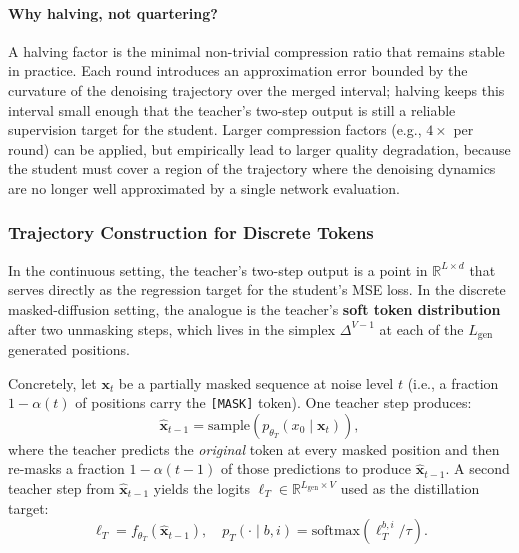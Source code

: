 \documentclass[11pt, a4paper]{article}
\begin{document}
\paragraph{Why halving, not quartering?}
A halving factor is the minimal non-trivial compression ratio that remains stable in
practice. Each round introduces an approximation error bounded by the curvature of the
denoising trajectory over the merged interval; halving keeps this interval small enough
that the teacher's two-step output is still a reliable supervision target for the student.
Larger compression factors (e.g., $4\times$ per round) can be applied, but empirically
lead to larger quality degradation, because the student must cover a region of the
trajectory where the denoising dynamics are no longer well approximated by a single
network evaluation.

\subsubsection{Trajectory Construction for Discrete Tokens}
\label{subsubsec:trajectory_construction}

In the continuous setting, the teacher's two-step output is a point in
$\mathbb{R}^{L \times d}$ that serves directly as the regression target for the student's
MSE loss. In the discrete masked-diffusion setting, the analogue is the teacher's
\textbf{soft token distribution} after two unmasking steps, which lives in the simplex
$\Delta^{V-1}$ at each of the $L_{\text{gen}}$ generated positions.

Concretely, let $\mathbf{x}_t$ be a partially masked sequence at noise level $t$ (i.e.,
a fraction $1-\alpha(t)$ of positions carry the \texttt{[MASK]} token). One teacher
step produces:
\begin{equation}
    \hat{\mathbf{x}}_{t-1} = \mathrm{sample}\!\left(
        p_{\theta_T}(x_0 \mid \mathbf{x}_t)
    \right),
    \label{eq:one_teacher_step}
\end{equation}
where the teacher predicts the \emph{original} token at every masked position and then
re-masks a fraction $1 - \alpha(t{-}1)$ of those predictions to produce
$\hat{\mathbf{x}}_{t-1}$. A second teacher step from $\hat{\mathbf{x}}_{t-1}$ yields
the logits $\ell_T \in \mathbb{R}^{L_{\text{gen}} \times V}$ used as the distillation
target:
\begin{equation}
    \ell_T = f_{\theta_T}(\hat{\mathbf{x}}_{t-1}),
    \quad
    p_T(\cdot \mid b, i) = \mathrm{softmax}\!\left(\ell_T^{b,i} / \tau\right).
    \label{eq:teacher_logits}
\end{equation}
\end{document}

